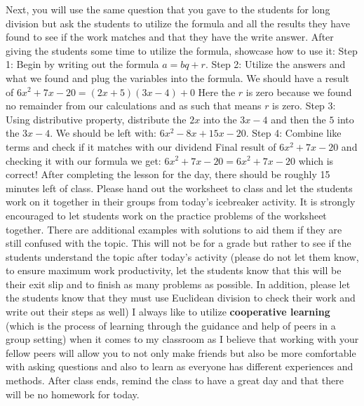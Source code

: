 \begin{outline}
    \1 Next, you will use the same question that you gave to the students for long division but ask the students to utilize the formula and all the results they have found to see if the work matches and that they have the write answer. After giving the students some time to utilize the formula, showcase how to use it:
        \2 Step 1: Begin by writing out the formula $a = bq + r$.
        \2 Step 2: Utilize the answers and what we found and plug the variables into the formula. We should have a result of $6x^2+7x-20 = (2x+5)(3x-4) + 0$
            \3 Here the $r$ is zero because we found no remainder from our calculations and as such that means $r$ is zero. 
        \2 Step 3: Using distributive property, distribute the $2x$ into the $3x-4$ and then the $5$ into the $3x-4$. We should be left with: $6x^2-8x+15x-20$.
        \2 Step 4: Combine like terms and check if it matches with our dividend
            \3 Final result of $6x^2+7x-20$ and checking it with our formula we get: $ 6x^2+7x-20 =  6x^2+7x-20 $ which is correct! 
    \1 After completing the lesson for the day, there should be roughly 15 minutes left of class. Please hand out the worksheet to class and let the students work on it together in their groups from today's icebreaker activity. It is strongly encouraged to let students work on the practice problems of the worksheet together. There are additional examples with solutions to aid them if they are still confused with the topic. This will not be for a grade but rather to see if the students understand the topic after today's activity (please do not let them know, to ensure maximum work productivity, let the students know that this will be their exit slip and to finish as many problems as possible. In addition, please let the students know that they must use Euclidean division to check their work and write out their steps as well)
        \2 I always like to utilize \textbf{cooperative learning} (which is the process of learning through the guidance and help of peers in a group setting) when it comes to my classroom as I believe that working with your fellow peers will allow you to not only make friends but also be more comfortable with asking questions and also to learn as everyone has different experiences and methods. 
    \1 After class ends, remind the class to have a great day and that there will be no homework for today. 
\end{outline}